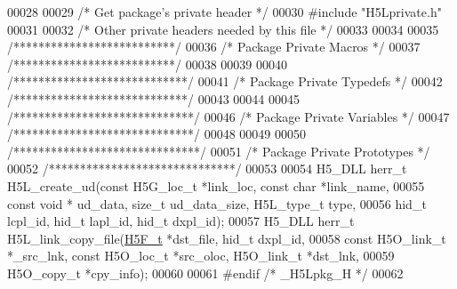 \begin{DoxyCode}
00028 
00029 \textcolor{comment}{/* Get package's private header */}
00030 \textcolor{preprocessor}{#include "H5Lprivate.h"}
00031 
00032 \textcolor{comment}{/* Other private headers needed by this file */}
00033 
00034 
00035 \textcolor{comment}{/**************************/}
00036 \textcolor{comment}{/* Package Private Macros */}
00037 \textcolor{comment}{/**************************/}
00038 
00039 
00040 \textcolor{comment}{/****************************/}
00041 \textcolor{comment}{/* Package Private Typedefs */}
00042 \textcolor{comment}{/****************************/}
00043 
00044 
00045 \textcolor{comment}{/*****************************/}
00046 \textcolor{comment}{/* Package Private Variables */}
00047 \textcolor{comment}{/*****************************/}
00048 
00049 
00050 \textcolor{comment}{/******************************/}
00051 \textcolor{comment}{/* Package Private Prototypes */}
00052 \textcolor{comment}{/******************************/}
00053 
00054 H5\_DLL herr\_t H5L\_create\_ud(\textcolor{keyword}{const} H5G\_loc\_t *link\_loc, \textcolor{keyword}{const} \textcolor{keywordtype}{char} *link\_name,
00055     \textcolor{keyword}{const} \textcolor{keywordtype}{void} * ud\_data, \textcolor{keywordtype}{size\_t} ud\_data\_size, H5L\_type\_t type,
00056     hid\_t lcpl\_id, hid\_t lapl\_id, hid\_t dxpl\_id);
00057 H5\_DLL herr\_t H5L\_link\_copy\_file(\hyperlink{struct_h5_f__t}{H5F\_t} *dst\_file, hid\_t dxpl\_id,
00058     \textcolor{keyword}{const} H5O\_link\_t *\_src\_lnk, \textcolor{keyword}{const} H5O\_loc\_t *src\_oloc, H5O\_link\_t *dst\_lnk,
00059     H5O\_copy\_t *cpy\_info);
00060 
00061 \textcolor{preprocessor}{#endif }\textcolor{comment}{/* \_H5Lpkg\_H */}\textcolor{preprocessor}{}
00062 
\end{DoxyCode}

